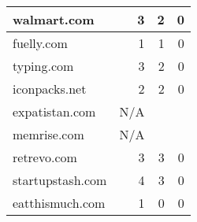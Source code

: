 \begin{table}
\begin{tabular}{lrrr}
    walmart.com       & 3                                                                       & 2                                                                                        & 0                                                                                      \\ \hline
    fuelly.com        & 1                                                                       & 1                                                                                        & 0                                                                                      \\
    typing.com        & 3                                                                       & 2                                                                                        & 0                                                                                      \\
    iconpacks.net     & 2                                                                       & 2                                                                                        & 0                                                                                      \\
    expatistan.com    & N/A                                                                     &                                                                                          &                                                                                        \\
    memrise.com       & N/A                                                                     &                                                                                          &                                                                                        \\
    retrevo.com       & 3                                                                       & 3                                                                                        & 0                                                                                      \\
    startupstash.com  & 4                                                                       & 3                                                                                        & 0                                                                                      \\
    eatthismuch.com   & 1                                                                       & 0                                                                                        & 0                                                                                      \\

\end{tabular}
\end{table}
